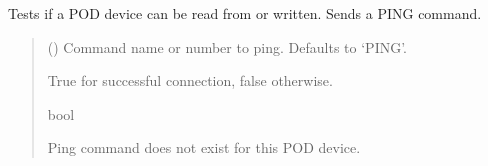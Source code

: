 \documentclass[letterpaper,10pt,english]{sphinxmanual}
\begin{document}
\begin{fulllineitems}
\begin{fulllineitems}
\label{\detokenize{Morelia.Devices:Morelia.Devices.BasicPodProtocol.Pod.TestConnection}}
\pysigstartsignatures
{}
\pysigstopsignatures
\sphinxAtStartPar
Tests if a POD device can be read from or written. Sends a PING command.
\begin{quote}\begin{description}
\sphinxAtStartPar
{} (\sphinxstyleliteralemphasis{\sphinxupquote{ | }}\sphinxstyleliteralemphasis{\sphinxupquote{, }}) \textendash{} Command name or number to ping. Defaults to ‘PING’.

\sphinxAtStartPar
True for successful connection, false otherwise.

\sphinxAtStartPar
bool

\sphinxAtStartPar
{} \textendash{} Ping command does not exist for this POD device.

\end{description}\end{quote}

\end{fulllineitems}



\end{fulllineitems}
\end{document}
